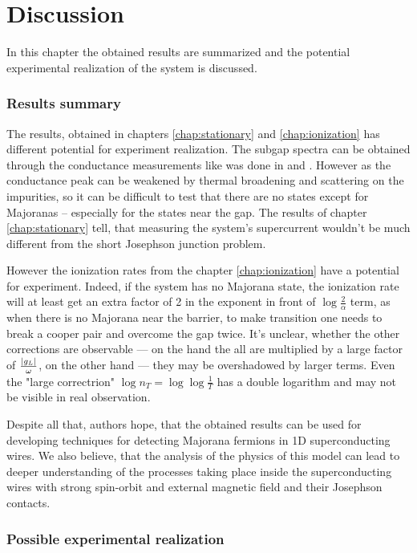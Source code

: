 \chapter{Discussion} 
\label{chap:discssion}
In this chapter the obtained results are summarized and the potential experimental realization of the system is discussed. 
\subsection{Results summary}
The results, obtained in chapters \ref{chap:stationary} and \ref{chap:ionization} has different potential for experiment realization. The subgap spectra can be obtained through the conductance measurements like was done in \cite{majorana_experiment_Kouwenhoven} and \cite{majorana_experiment_Zhang}. However as the conductance peak can be weakened by thermal broadening and scattering on the impurities, so it can be difficult to test that there are no states except for Majoranas -- especially for the states near the gap. The results of chapter \ref{chap:stationary} tell, that measuring the system's supercurrent wouldn't be much different from the short Josephson junction problem.

However the ionization rates from the chapter \ref{chap:ionization} have a potential for experiment. Indeed, if the system has no Majorana state, the ionization rate will at least get an extra factor of 2 in the exponent in front of $ \log\frac{2}{\alpha} $ term, as when there is no Majorana near the barrier, to make transition one needs to break a cooper pair and overcome the gap twice. It's unclear, whether the other corrections are observable --- on the hand the all are multiplied by a large factor of $ \frac{\left|g_L\right|}{\omega} $, on the other hand --- they may be overshadowed by larger terms. Even the "large correctrion" $ \log n_T = \log \log \frac{1}{T} $ has a double logarithm and may not be visible in real observation.

Despite all that, authors hope, that the obtained results can be used for developing techniques for detecting Majorana fermions in 1D superconducting wires. We also believe, that the analysis of the physics of this model can lead to deeper understanding of the processes taking place inside the superconducting wires with strong spin-orbit and external magnetic field and their Josephson contacts.

\subsection{Possible experimental realization}

